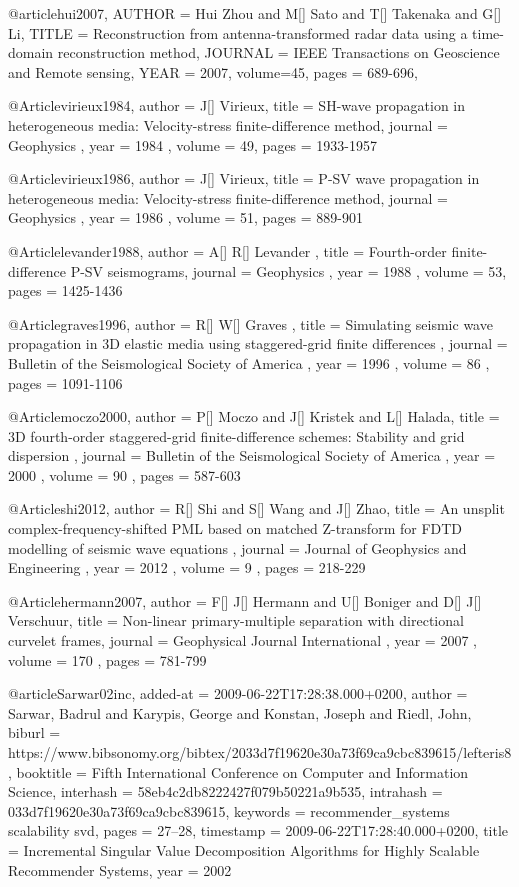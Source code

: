 @article{hui2007,
  AUTHOR =       {Hui Zhou and M[] Sato and T[] Takenaka and G[] Li},
  TITLE =        {Reconstruction from antenna-transformed radar data using a time-domain reconstruction method},
  JOURNAL =      {IEEE Transactions on Geoscience and Remote sensing},
  YEAR =         {2007},
  volume=45,
  pages = {689-696},
}

@Article{virieux1984,
 author =  { J[] Virieux},
 title =   { SH-wave propagation in heterogeneous media: Velocity-stress finite-difference method},
 journal = { Geophysics },
 year =    { 1984 },
 volume =  { 49},
 pages =   { 1933-1957 }
}

@Article{virieux1986,
 author =  { J[] Virieux},
 title =   { P-SV wave propagation in heterogeneous media: Velocity-stress finite-difference method},
 journal = { Geophysics },
 year =    { 1986 },
 volume =  { 51},
 pages =   { 889-901 }
}

@Article{levander1988,
 author =  { A[] R[] Levander },
 title =   { Fourth-order finite-difference P-SV seismograms},
 journal = { Geophysics },
 year =    { 1988 },
 volume =  { 53},
 pages =   { 1425-1436 }
}

@Article{graves1996,
 author =  { R[] W[] Graves },
 title =   { Simulating seismic wave propagation in 3{D} elastic media using staggered-grid finite differences },
 journal = { Bulletin of the Seismological Society of America },
 year =    { 1996 },
 volume =  { 86 },
 pages =   { 1091-1106 }
}

@Article{moczo2000,
 author =  {  P[] Moczo and J[] Kristek and L[] Halada},
 title =   { 3{D} fourth-order staggered-grid finite-difference schemes: Stability and grid dispersion },
 journal = { Bulletin of the Seismological Society of America },
 year =    { 2000 },
 volume =  { 90 },
 pages =   { 587-603 }
}


@Article{shi2012,
 author =  {  R[] Shi and S[] Wang and J[] Zhao},
 title =   {An unsplit complex-frequency-shifted PML based on matched Z-transform for FDTD modelling of seismic wave equations },
 journal = { Journal of Geophysics and Engineering },
 year =    { 2012 },
 volume =  { 9 },
 pages =   { 218-229 }
}

@Article{hermann2007,
 author =  {  F[] J[] Hermann and U[] Boniger and D[] J[] Verschuur},
 title =   {Non-linear primary-multiple separation with directional curvelet frames},
 journal = { Geophysical Journal International },
 year =    { 2007 },
 volume =  { 170 },
 pages =   { 781-799 }
}

@article{Sarwar02inc,
  added-at = {2009-06-22T17:28:38.000+0200},
  author = {Sarwar, Badrul and Karypis, George and Konstan, Joseph and Riedl, John},
  biburl = {https://www.bibsonomy.org/bibtex/2033d7f19620e30a73f69ca9cbc839615/lefteris8},
  booktitle = {Fifth International Conference on Computer and Information Science},
  interhash = {58eb4c2db8222427f079b50221a9b535},
  intrahash = {033d7f19620e30a73f69ca9cbc839615},
  keywords = {recommender_systems scalability svd},
  pages = {27--28},
  timestamp = {2009-06-22T17:28:40.000+0200},
  title = {Incremental Singular Value Decomposition Algorithms for Highly Scalable
	Recommender Systems},
  year = 2002
}

